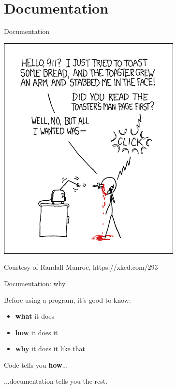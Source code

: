 \documentclass[10pt]{beamer}
\begin{document}

\section{Documentation} %

\begin{frame}{Documentation} %
	\begin{center}
		\includegraphics[height=.85\textheight]{images/docs/rtfm.png}
	\end{center}
	{\tiny Courtesy of Randall Munroe, https://xkcd.com/293}
\end{frame}

\begin{frame}{Documentation: why} %

	\large
	Before using a program, it's good to know:

	\begin{itemize}
		\item \textbf{what} it does
		\item \textbf{how} it does it
		\item \textbf{why} it does it like that
	\end{itemize}

	\pause
	\bigskip

	Code tells you \textbf{how}...
	\begin{flushright}
		...documentation tells you the rest.
	\end{flushright}

\end{frame}
\end{document}
